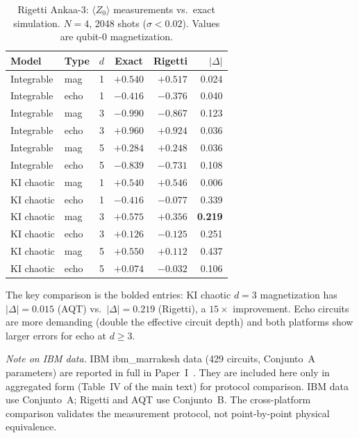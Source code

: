 \documentclass[twocolumn,showpacs,preprintnumbers,amsmath,amssymb,aps,prl]{revtex4-2}
\begin{document}
\begin{table}[h]
\caption{Rigetti Ankaa-3: $\langle Z_0 \rangle$ measurements vs.\ exact
simulation. $N=4$, 2048 shots ($\sigma < 0.02$). Values are qubit-0
magnetization.}
\label{tab:rigetti}
\begin{ruledtabular}
\begin{tabular}{llccrr}
Model & Type & $d$ & Exact & Rigetti & $|\Delta|$ \\
\hline
Integrable & mag  & 1 & $+0.540$ & $+0.517$ & 0.024 \\
Integrable & echo & 1 & $-0.416$ & $-0.376$ & 0.040 \\
Integrable & mag  & 3 & $-0.990$ & $-0.867$ & 0.123 \\
Integrable & echo & 3 & $+0.960$ & $+0.924$ & 0.036 \\
Integrable & mag  & 5 & $+0.284$ & $+0.248$ & 0.036 \\
Integrable & echo & 5 & $-0.839$ & $-0.731$ & 0.108 \\
KI chaotic & mag  & 1 & $+0.540$ & $+0.546$ & 0.006 \\
KI chaotic & echo & 1 & $-0.416$ & $-0.077$ & 0.339 \\
KI chaotic & mag  & 3 & $+0.575$ & $+0.356$ & \textbf{0.219} \\
KI chaotic & echo & 3 & $+0.126$ & $-0.125$ & 0.251 \\
KI chaotic & mag  & 5 & $+0.550$ & $+0.112$ & 0.437 \\
KI chaotic & echo & 5 & $+0.074$ & $-0.032$ & 0.106 \\
\end{tabular}
\end{ruledtabular}
\end{table}

The key comparison is the bolded entries: KI chaotic $d=3$ magnetization has
$|\Delta| = 0.015$ (AQT) vs.\ $|\Delta| = 0.219$ (Rigetti), a $15\times$
improvement. Echo circuits are more demanding (double the effective circuit depth)
and both platforms show larger errors for echo at $d \geq 3$.

\textit{Note on IBM data.}
IBM ibm\_marrakesh data (429 circuits, Conjunto~A parameters) are reported in
full in Paper~I~\cite{PerezEugenio2026a}. They are included here only in
aggregated form (Table~IV of the main text) for protocol comparison. IBM data
use Conjunto~A; Rigetti and AQT use Conjunto~B. The cross-platform comparison
validates the measurement protocol, not point-by-point physical equivalence.
\end{document}
